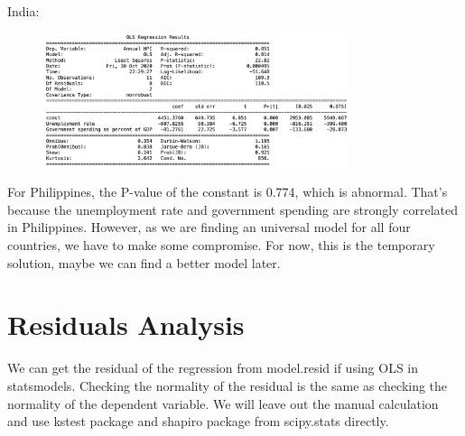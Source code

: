 \documentclass[11pt]{article}
\begin{document}
India:
\begin{figure}[H]
\begin{center}
    \includegraphics[width=0.8\textwidth]{./image/Reg_IND.png}
\end{center}
\end{figure}

For Philippines, the P-value of the constant is 0.774, which is abnormal. That's because the unemployment rate and government spending are strongly correlated in Philippines. However, as we are finding an universal model for all four countries, we have to make some compromise. For now, this is the temporary solution, maybe we can find a better model later.

\section{Residuals Analysis}\label{residuals_analysis}
We can get the residual of the regression from model.resid if using OLS in statsmodels. Checking the normality of the residual is the same as checking the normality of the dependent variable. We will leave out the manual calculation and use kstest package and shapiro package from scipy.stats directly.


\end{document}
